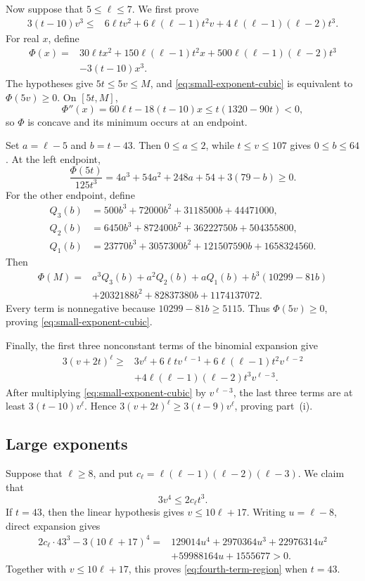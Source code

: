 \documentclass[11pt]{article}
\numberwithin{equation}{section}
\theoremstyle{definition}
\theoremstyle{remark}
\begin{document}
Now suppose that \(5\le\ell\le7\).  We first prove
\begin{align}
 3(t-10)v^3\le{}&6\ell t v^2
 +6\ell(\ell-1)t^2v
 +4\ell(\ell-1)(\ell-2)t^3. \label{eq:small-exponent-cubic}
\end{align}
For real \(x\), define
\begin{align*}
 \Phi(x)={}&30\ell t x^2+150\ell(\ell-1)t^2x
       +500\ell(\ell-1)(\ell-2)t^3\\
       &-3(t-10)x^3.
\end{align*}
The hypotheses give \(5t\le5v\le M\), and
\eqref{eq:small-exponent-cubic} is equivalent to \(\Phi(5v)\ge0\).  On
\([5t,M]\),
\[
 \Phi''(x)=60\ell t-18(t-10)x
 \le t(1320-90t)<0,
\]
so \(\Phi\) is concave and its minimum occurs at an endpoint.

Set \(a=\ell-5\) and \(b=t-43\).  Then \(0\le a\le2\), while
\(t\le v\le107\) gives \(0\le b\le64\).  At the left endpoint,
\[
 \frac{\Phi(5t)}{125t^3}
 =4a^3+54a^2+248a+54+3(79-b)\ge0.
\]
For the other endpoint, define
\begin{align*}
 Q_3(b)&=500b^3+72000b^2+3118500b+44471000,\\
 Q_2(b)&=6450b^3+872400b^2+36222750b+504355800,\\
 Q_1(b)&=23770b^3+3057300b^2+121507590b+1658324560.
\end{align*}
Then
\begin{align*}
 \Phi(M)={}&a^3Q_3(b)+a^2Q_2(b)+aQ_1(b)
 +b^3(10299-81b)\\
 &+2032188b^2+82837380b+1174137072.
\end{align*}
Every term is nonnegative because \(10299-81b\ge5115\).  Thus
\(\Phi(5v)\ge0\), proving \eqref{eq:small-exponent-cubic}.

Finally, the first three nonconstant terms of the binomial expansion give
\begin{align*}
3(v+2t)^\ell\ge{}&3v^\ell+6\ell t v^{\ell-1}
 +6\ell(\ell-1)t^2v^{\ell-2}\\
&+4\ell(\ell-1)(\ell-2)t^3v^{\ell-3}.
\end{align*}
After multiplying \eqref{eq:small-exponent-cubic} by
\(v^{\ell-3}\), the last three terms are at least
\(3(t-10)v^\ell\).  Hence
\(3(v+2t)^\ell\ge3(t-9)v^\ell\), proving part~\textup{(i)}.

\subsection{Large exponents}

Suppose that \(\ell\ge8\), and put
\(c_\ell=\ell(\ell-1)(\ell-2)(\ell-3)\).  We claim that
\begin{equation}\label{eq:fourth-term-region}
 3v^4\le2c_\ell t^3.
\end{equation}
If \(t=43\), then the linear hypothesis gives
\(v\le10\ell+17\).  Writing \(u=\ell-8\), direct expansion gives
\begin{align*}
2c_\ell\cdot43^3-3(10\ell+17)^4
={}&129014u^4+2970364u^3+22976314u^2\\
 &+59988164u+1555677>0.
\end{align*}
Together with \(v\le10\ell+17\), this proves
\eqref{eq:fourth-term-region} when \(t=43\).
\end{document}
